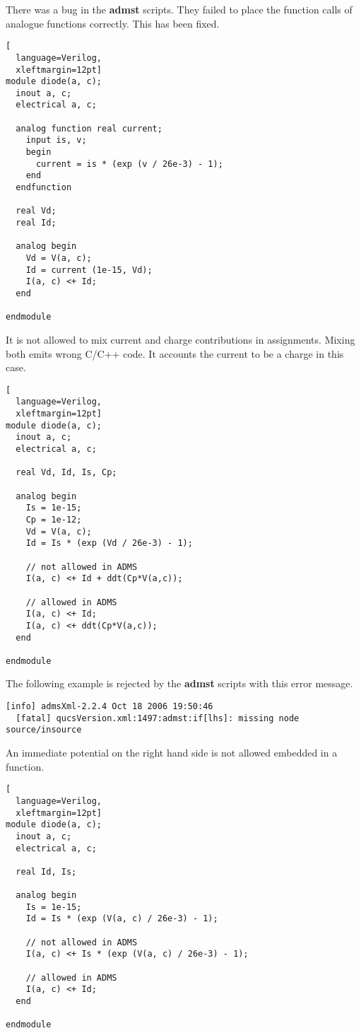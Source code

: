 
There was a bug in the \textbf{admst} scripts.  They failed to place
the function calls of analogue functions correctly.  This has been
fixed.

\begin{lstlisting}[
  language=Verilog,
  xleftmargin=12pt]
module diode(a, c);  
  inout a, c;
  electrical a, c;

  analog function real current;
    input is, v;
    begin
      current = is * (exp (v / 26e-3) - 1);
    end
  endfunction

  real Vd;
  real Id;

  analog begin
    Vd = V(a, c);
    Id = current (1e-15, Vd);
    I(a, c) <+ Id;
  end

endmodule
\end{lstlisting}


It is not allowed to mix current and charge contributions in
assignments.  Mixing both emits wrong C/C++ code.  It accounts the
current to be a charge in this case.

\begin{lstlisting}[
  language=Verilog,
  xleftmargin=12pt]
module diode(a, c);  
  inout a, c;
  electrical a, c;

  real Vd, Id, Is, Cp;

  analog begin
    Is = 1e-15;
    Cp = 1e-12;
    Vd = V(a, c);
    Id = Is * (exp (Vd / 26e-3) - 1);

    // not allowed in ADMS
    I(a, c) <+ Id + ddt(Cp*V(a,c));

    // allowed in ADMS
    I(a, c) <+ Id;
    I(a, c) <+ ddt(Cp*V(a,c));
  end

endmodule
\end{lstlisting}


The following example is rejected by the \textbf{admst} scripts with
this error message.

\begin{Verbatim}[fontsize=\small]
  [info] admsXml-2.2.4 Oct 18 2006 19:50:46
  [fatal] qucsVersion.xml:1497:admst:if[lhs]: missing node source/insource
\end{Verbatim}

An immediate potential on the right hand side is not allowed embedded
in a function.

\begin{lstlisting}[
  language=Verilog,
  xleftmargin=12pt]
module diode(a, c);  
  inout a, c;
  electrical a, c;

  real Id, Is;

  analog begin
    Is = 1e-15;
    Id = Is * (exp (V(a, c) / 26e-3) - 1);

    // not allowed in ADMS
    I(a, c) <+ Is * (exp (V(a, c) / 26e-3) - 1);

    // allowed in ADMS
    I(a, c) <+ Id;
  end

endmodule
\end{lstlisting}

